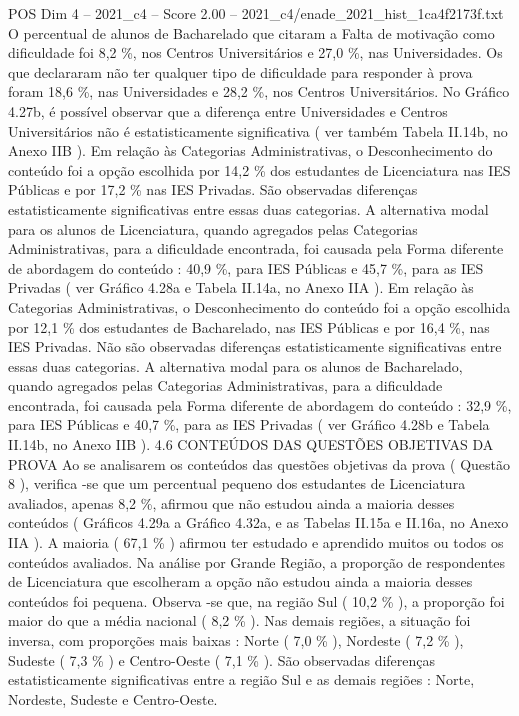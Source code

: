 \begin{textsample}{POS Dim 4 – 2021\_c4 – Score 2.00 – 2021\_c4/enade\_2021\_hist\_1ca4f2173f.txt}
O percentual de alunos de Bacharelado que citaram a Falta de motivação como dificuldade foi 8,2 \%, nos Centros Universitários e 27,0 \%, nas Universidades.
Os que declararam não ter qualquer tipo de dificuldade para responder à prova foram 18,6 \%, nas Universidades e 28,2 \%, nos Centros Universitários.
No Gráfico 4.27b, é possível observar que a diferença entre Universidades e Centros Universitários não é estatisticamente significativa ( ver também Tabela II.14b, no Anexo IIB ).
Em relação às Categorias Administrativas, o Desconhecimento do conteúdo foi a opção escolhida por 14,2 \% dos estudantes de Licenciatura nas IES Públicas e por 17,2 \% nas IES Privadas.
São observadas diferenças estatisticamente significativas entre essas duas categorias.
A alternativa modal para os alunos de Licenciatura, quando agregados pelas Categorias Administrativas, para a dificuldade encontrada, foi causada pela Forma diferente de abordagem do conteúdo : 40,9 \%, para IES Públicas e 45,7 \%, para as IES Privadas ( ver Gráfico 4.28a e Tabela II.14a, no Anexo IIA ).
Em relação às Categorias Administrativas, o Desconhecimento do conteúdo foi a opção escolhida por 12,1 \% dos estudantes de Bacharelado, nas IES Públicas e por 16,4 \%, nas IES Privadas.
Não são observadas diferenças estatisticamente significativas entre essas duas categorias.
A alternativa modal para os alunos de Bacharelado, quando agregados pelas Categorias Administrativas, para a dificuldade encontrada, foi causada pela Forma diferente de abordagem do conteúdo : 32,9 \%, para IES Públicas e 40,7 \%, para as IES Privadas ( ver Gráfico 4.28b e Tabela II.14b, no Anexo IIB ). 4.6 CONTEÚDOS DAS QUESTÕES OBJETIVAS DA PROVA Ao se analisarem os conteúdos das questões objetivas da prova ( Questão 8 ), verifica -se que um percentual pequeno dos estudantes de Licenciatura avaliados, apenas 8,2 \%, afirmou que não estudou ainda a maioria desses conteúdos ( Gráficos 4.29a a Gráfico 4.32a, e as Tabelas II.15a e II.16a, no Anexo IIA ).
A maioria ( 67,1 \% ) afirmou ter estudado e aprendido muitos ou todos os conteúdos avaliados.
Na análise por Grande Região, a proporção de respondentes de Licenciatura que escolheram a opção não estudou ainda a maioria desses conteúdos foi pequena.
Observa -se que, na região Sul ( 10,2 \% ), a proporção foi maior do que a média nacional ( 8,2 \% ).
Nas demais regiões, a situação foi inversa, com proporções mais baixas : Norte ( 7,0 \% ), Nordeste ( 7,2 \% ), Sudeste ( 7,3 \% ) e Centro-Oeste ( 7,1 \% ).
São observadas diferenças estatisticamente significativas entre a região Sul e as demais regiões : Norte, Nordeste, Sudeste e Centro-Oeste.

\end{textsample}

